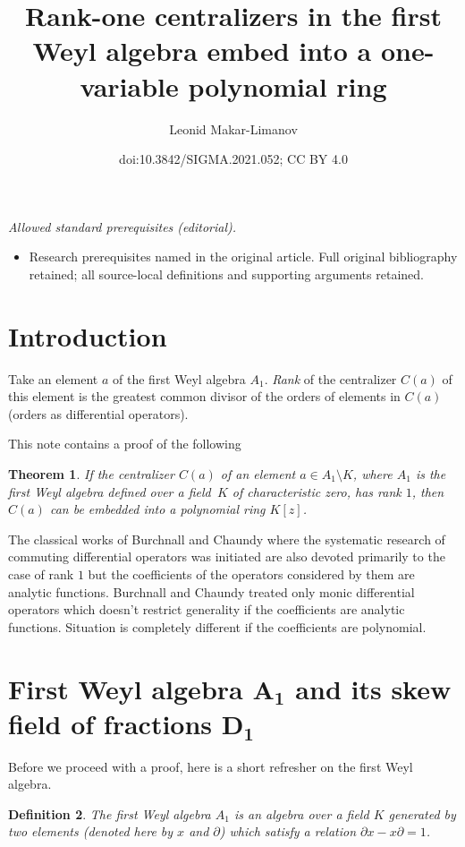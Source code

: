 \documentclass[10pt,a4paper]{amsart}
\title{Rank-one centralizers in the first Weyl algebra embed into a one-variable polynomial ring}
\author{Leonid Makar-Limanov}
\date{doi:10.3842/SIGMA.2021.052; CC BY 4.0}
\numberwithin{equation}{section}
\newtheorem{Theorem}{Theorem}[section]
\newtheorem{Definition}[Theorem]{Definition}
\newcommand{\de}{\partial}
\begin{document}
\maketitle
\noindent\textit{Allowed standard prerequisites (editorial).}\begin{itemize}
\item Research prerequisites named in the original article. Full original bibliography retained; all source-local definitions and supporting arguments retained.
\end{itemize}\medskip
\section{Introduction}

Take an element $a$ of the first Weyl algebra $A_1$. {\it Rank} of the centralizer $C(a)$ of this element is
the greatest common divisor of the orders of elements in $C(a)$ (orders as differential operators).

This note contains a proof of the following


\begin{Theorem}If the centralizer $C(a)$ of an element $a \in A_1\setminus K$, where $A_1$ is the first Weyl algebra defined over a field~$K$
of characteristic zero, has rank $1$, then $C(a)$ can be embedded into a polynomial ring $K[z]$.
\end{Theorem}


The classical works of Burchnall and Chaundy where the systematic research
of commuting differential operators was initiated are also devoted primarily to
the case of rank $1$ but the coefficients of the operators considered by them
are analytic functions.
Burchnall and Chaundy treated only monic differential operators which
doesn't restrict generality if the coefficients are analytic functions.
Situation is completely different if the coefficients are polynomial.

\section[First Weyl algebra A1 and its skew field of fractions D1]
{First Weyl algebra $\boldsymbol{A_1}$ and its skew field of fractions $\boldsymbol{D_1}$}\label{2q0}

Before we proceed with a proof, here is a short refresher on the first Weyl algebra.

\begin{Definition}
The first Weyl algebra $A_1$ is an algebra over a field $K$
generated by two elements (denoted here by $x$ and $\de$) which satisfy a
relation $\de x - x \de = 1$.
\end{Definition}
\end{document}
